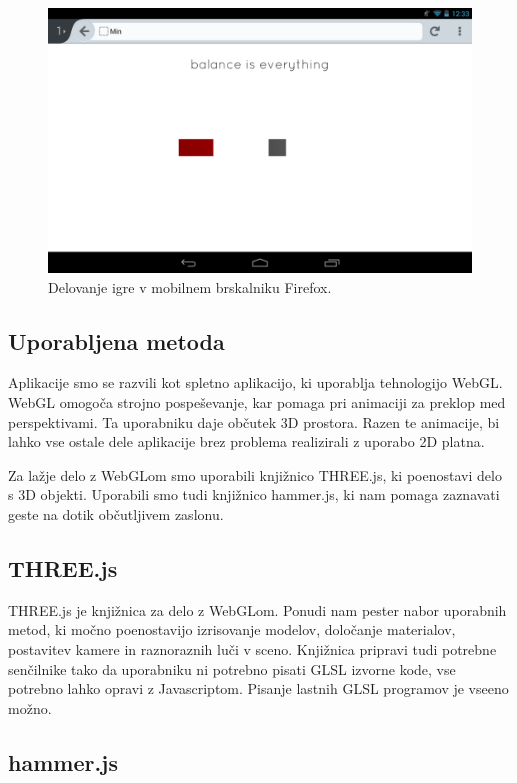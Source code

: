 \begin{figure}
\begin{center}
\includegraphics[width=12cm]{pic/min-ff.png}
\end{center}
\caption{Delovanje igre v mobilnem brskalniku Firefox.}
\label{minff}
\end{figure}

\subsection{Uporabljena metoda}

Aplikacije smo se razvili kot spletno aplikacijo, ki uporablja tehnologijo WebGL. WebGL omogoča strojno pospeševanje, kar pomaga pri animaciji za preklop med perspektivami. Ta uporabniku daje občutek 3D prostora. Razen te animacije, bi lahko vse ostale dele aplikacije brez problema realizirali z uporabo 2D platna.

Za lažje delo z WebGLom smo uporabili knjižnico THREE.js, ki poenostavi delo s 3D objekti. Uporabili smo tudi knjižnico hammer.js, ki nam pomaga zaznavati geste na dotik občutljivem zaslonu.


\subsection{THREE.js}

THREE.js je knjižnica za delo z WebGLom. Ponudi nam pester nabor uporabnih metod, ki močno poenostavijo izrisovanje modelov, določanje materialov, postavitev kamere in raznoraznih luči v sceno. Knjižnica pripravi tudi potrebne senčilnike tako da uporabniku ni potrebno pisati GLSL izvorne kode, vse potrebno lahko opravi z Javascriptom. Pisanje lastnih GLSL programov je vseeno možno.

\subsection{hammer.js}

